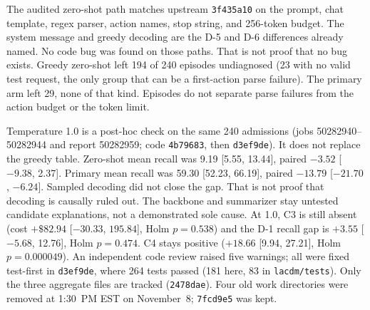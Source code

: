 \documentclass[11pt,letterpaper]{article}
\begin{document}
\noindent
The audited zero-shot path matches upstream \texttt{3f435a10} on the prompt, chat template, regex parser, action names, stop string, and 256-token budget. The system message and greedy decoding are the D-5 and D-6 differences already named. No code bug was found on those paths. That is not proof that no bug exists. Greedy zero-shot left 194 of 240 episodes undiagnosed (23 with no valid test request, the only group that can be a first-action parse failure). The primary arm left 29, none of that kind. Episodes do not separate parse failures from the action budget or the token limit.

\noindent
Temperature 1.0 is a post-hoc check on the same 240 admissions (jobs 50282940--50282944 and report 50282959; code \texttt{4b79683}, then \texttt{d3ef9de}). It does not replace the greedy table. Zero-shot mean recall was 9.19 [5.55, 13.44], paired $-3.52$ [$-9.38$, 2.37]. Primary mean recall was 59.30 [52.23, 66.19], paired $-13.79$ [$-21.70$, $-6.24$]. Sampled decoding did not close the gap. That is not proof that decoding is causally ruled out. The backbone and summarizer stay untested candidate explanations, not a demonstrated sole cause. At 1.0, C3 is still absent (cost $+\$82.94$ [$-30.33$, $195.84$], Holm $p = 0.538$) and the D-1 recall gap is $+3.55$ [$-5.68$, 12.76], Holm $p = 0.474$. C4 stays positive ($+18.66$ [9.94, 27.21], Holm $p = 0.000049$). An independent code review raised five warnings; all were fixed test-first in \texttt{d3ef9de}, where 264 tests passed (181 here, 83 in \texttt{lacdm/tests}). Only the three aggregate files are tracked (\texttt{2478dae}). Four old work directories were removed at 1:30~PM EST on November~8; \texttt{7fcd9e5} was kept.
\end{document}
